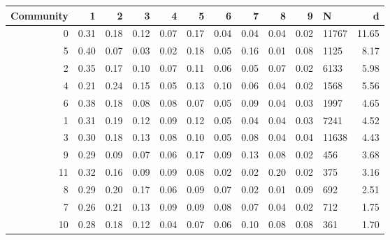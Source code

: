 \begin{tabular}{rrrrrrrrrrlr}
\toprule
 Community &    1 &    2 &    3 &    4 &    5 &    6 &    7 &    8 &    9 &      N &     d \\
\midrule
         0 & 0.31 & 0.18 & 0.12 & 0.07 & 0.17 & 0.04 & 0.04 & 0.04 & 0.02 &  11767 & 11.65 \\
         5 & 0.40 & 0.07 & 0.03 & 0.02 & 0.18 & 0.05 & 0.16 & 0.01 & 0.08 &   1125 &  8.17 \\
         2 & 0.35 & 0.17 & 0.10 & 0.07 & 0.11 & 0.06 & 0.05 & 0.07 & 0.02 &   6133 &  5.98 \\
         4 & 0.21 & 0.24 & 0.15 & 0.05 & 0.13 & 0.10 & 0.06 & 0.04 & 0.02 &   1568 &  5.56 \\
         6 & 0.38 & 0.18 & 0.08 & 0.08 & 0.07 & 0.05 & 0.09 & 0.04 & 0.03 &   1997 &  4.65 \\
         1 & 0.31 & 0.19 & 0.12 & 0.09 & 0.12 & 0.05 & 0.04 & 0.04 & 0.03 &   7241 &  4.52 \\
         3 & 0.30 & 0.18 & 0.13 & 0.08 & 0.10 & 0.05 & 0.08 & 0.04 & 0.04 &  11638 &  4.43 \\
         9 & 0.29 & 0.09 & 0.07 & 0.06 & 0.17 & 0.09 & 0.13 & 0.08 & 0.02 &    456 &  3.68 \\
        11 & 0.32 & 0.16 & 0.09 & 0.09 & 0.08 & 0.02 & 0.02 & 0.20 & 0.02 &    375 &  3.16 \\
         8 & 0.29 & 0.20 & 0.17 & 0.06 & 0.09 & 0.07 & 0.02 & 0.01 & 0.09 &    692 &  2.51 \\
         7 & 0.26 & 0.21 & 0.13 & 0.09 & 0.09 & 0.08 & 0.07 & 0.04 & 0.02 &    712 &  1.75 \\
        10 & 0.28 & 0.18 & 0.12 & 0.04 & 0.07 & 0.06 & 0.10 & 0.08 & 0.08 &    361 &  1.70 \\
\bottomrule
\end{tabular}

